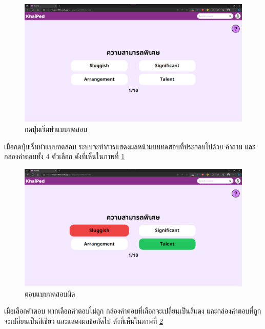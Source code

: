 \documentclass[12pt,oneside,openright,a4paper]{cpe-thai-project}
\begin{document}
\pagebreak
\begin{figure}[!h]\centering
	\includegraphics[width=\textwidth, keepaspectratio=true]{image/chap4/UI/quiz/start.png}
	\caption{{กดปุ่มเริ่มทำแบบทดสอบ}}\label{fig:chap4UIQuizStart}
\end{figure}
\hspace{1cm}
เมื่อกดปุ่มเริ่มทำแบบทดสอบ ระบบจะทำการแสดงผลหน้าแบบทดสอบที่ประกอบไปด้วย คำถาม และกล่องคำตอบทั้ง 4 ตัวเลือก
ดังที่เห็นในภาพที่ \ref{fig:chap4UIQuizStart}

\begin{figure}[!h]\centering
	\includegraphics[width=\textwidth, keepaspectratio=true]{image/chap4/UI/quiz/wrong.png}
	\caption{{ตอบแบบทดสอบผิด}}\label{fig:chap4UIQuizWrong}
\end{figure}
\hspace{1cm}
เมื่อเลือกคำตอบ หากเลือกคำตอบไม่ถูก กล่องคำตอบที่เลือกจะเปลี่ยนเป็นสีแดง และกล่องคำตอบที่ถูกจะเปลี่ยนเป็นสีเขียว และแสดงผลข้อถัดไป
ดังที่เห็นในภาพที่ \ref{fig:chap4UIQuizWrong}
\end{document}
